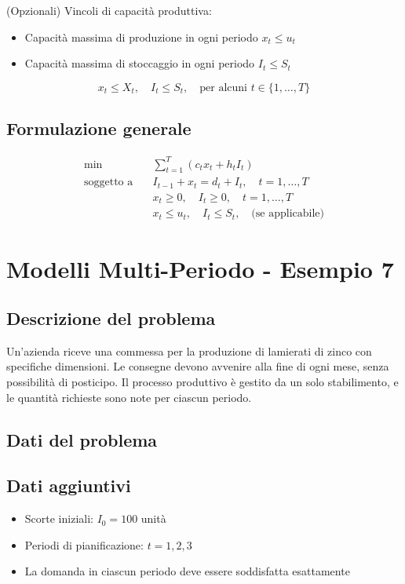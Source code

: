 (Opzionali) Vincoli di capacità produttiva:
\begin{itemize}
    \item Capacità massima di produzione in ogni periodo $x_t \leq u_t$
    \item Capacità massima di stoccaggio in ogni periodo $I_t \leq S_t$
\end{itemize}

\[ 
x_t \leq X_t, \quad I_t \leq S_t, \quad \text{per alcuni } t \in \{1, \dots, T\}
\]

\subsection{Formulazione generale}
\[ 
\begin{aligned}
\min \quad & \sum_{t=1}^{T} \left( c_t x_t + h_t I_t \right) \\
\text{soggetto a} \quad 
& I_{t-1} + x_t = d_t + I_t, \quad t = 1, \dots, T \\
& x_t \geq 0, \quad I_t \geq 0, \quad t = 1, \dots, T \\
& x_t \leq u_t, \quad I_t \leq S_t, \quad \text{(se applicabile)}
\end{aligned}
\]

\section{Modelli Multi-Periodo - Esempio 7}

\subsection{Descrizione del problema}

Un'azienda riceve una commessa per la produzione di lamierati di zinco 
con specifiche dimensioni. Le consegne devono avvenire alla fine di ogni mese, 
senza possibilità di posticipo. Il processo produttivo è gestito da un 
solo stabilimento, e le quantità richieste sono note per ciascun periodo.

\subsection{Dati del problema}

\subsection{Dati aggiuntivi}
\begin{itemize}
    \item Scorte iniziali: $I_0 = 100$ unità
    \item Periodi di pianificazione: $t = 1, 2, 3$
    \item La domanda in ciascun periodo deve essere soddisfatta esattamente
\end{itemize}

